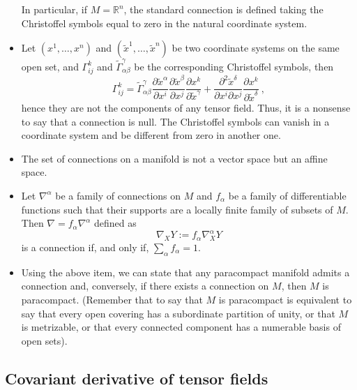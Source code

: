 \documentclass[12pt]{report}
\def\Real{\mathbb{R}}
\begin{document}
\begin{itemize}
In particular, if $M=\Real^n$, the standard connection is defined 
taking the Christoffel symbols equal to zero in the natural coordinate system.
\item
Let $(x^{1},\ldots, x^{n})$ and $(\tilde{x}^{1},\ldots, \tilde{x}^{n})$ be two coordinate systems on the same open set, and $\Gamma_{ij}^{k}$ and $\widetilde{\Gamma}_{\alpha\beta}^{\gamma}$ be the corresponding Christoffel symbols, then
$$
\Gamma_{ij}^{k}=\widetilde{\Gamma}_{\alpha\beta}^{\gamma}
\frac{\partial \tilde{x}^{\alpha}}{\partial x^{i}}
\frac{\partial \tilde{x}^{\beta}}{\partial x^{j}}
\frac{\partial x^{k} }{\partial \tilde{x}^{\gamma}}+
\frac{\partial^{2} \tilde{x}^{\delta} }{\partial x^{i}\partial x^{j}}\frac{\partial x^{k} }{\partial \tilde{x}^{\delta} }\ ,
$$
hence they are not the components of any tensor field.
Thus, it is a nonsense to say that a connection is null. 
The Christoffel symbols can vanish in a coordinate system and be different from zero in another one.
\item
The set of connections on a manifold is not a vector space but an affine space.
\item 
Let $\nabla^{\alpha}$ be a family  of connections on $M$ and $f_{\alpha}$ be a family of differentiable functions such that their supports are a locally finite family of subsets of $M$. Then $\nabla=f_{\alpha}\nabla^{\alpha}$ defined as 
$$
\nabla_{X}Y:=f_{\alpha}\nabla^{\alpha}_{X}Y
$$
is a connection if, and only if, $\displaystyle\sum_{\alpha}f_{\alpha}=1$.
\item
Using the above item, we can state that 
any paracompact manifold admits a connection and, conversely,
if there exists a connection on $M$, then $M$ is paracompact.
(Remember that to say that $M$ is paracompact is equivalent to say
 that every open covering has a subordinate partition of unity, 
or that $M$ is metrizable, or that every connected component has a numerable basis of open sets).
\end{itemize}


\subsection{Covariant derivative of tensor fields}
\end{document}
